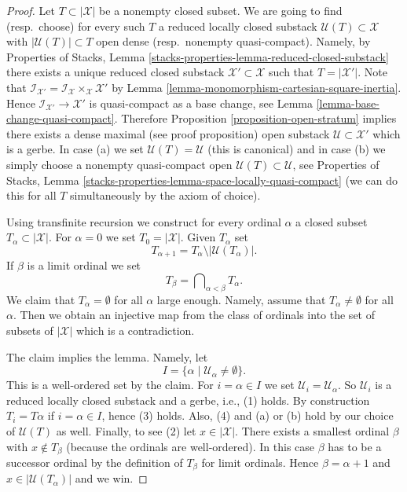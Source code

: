 \documentclass[10pt,a4paper]{amsart}
\theoremstyle{plain}
\theoremstyle{definition}
\theoremstyle{remark}
\numberwithin{equation}{subsection}
\begin{document}
\begin{proof}
Let $T \subset |\mathcal{X}|$ be a nonempty closed subset. We are going
to find (resp.\ choose) for every such $T$ a reduced locally closed substack
$\mathcal{U}(T) \subset \mathcal{X}$ with $|\mathcal{U}(T)| \subset T$
open dense (resp.\ nonempty quasi-compact). Namely, by
Properties of Stacks, Lemma
\ref{stacks-properties-lemma-reduced-closed-substack}
there exists a unique reduced closed substack
$\mathcal{X}' \subset \mathcal{X}$ such that $T = |\mathcal{X}'|$.
Note that $\mathcal{I}_{\mathcal{X}'} =
\mathcal{I}_\mathcal{X} \times_\mathcal{X} \mathcal{X}'$ by
Lemma \ref{lemma-monomorphism-cartesian-square-inertia}.
Hence $\mathcal{I}_{\mathcal{X}'} \to \mathcal{X}'$ is
quasi-compact as a base change, see
Lemma \ref{lemma-base-change-quasi-compact}.
Therefore
Proposition \ref{proposition-open-stratum}
implies there exists a dense maximal (see proof proposition)
open substack $\mathcal{U} \subset \mathcal{X}'$
which is a gerbe. In case (a) we set $\mathcal{U}(T) = \mathcal{U}$
(this is canonical) and in case (b) we simply choose a nonempty quasi-compact
open $\mathcal{U}(T) \subset \mathcal{U}$, see
Properties of Stacks, Lemma
\ref{stacks-properties-lemma-space-locally-quasi-compact}
(we can do this for all $T$
simultaneously by the axiom of choice).

\medskip\noindent
Using transfinite recursion we construct for every ordinal $\alpha$ a
closed subset $T_\alpha \subset |\mathcal{X}|$. For $\alpha = 0$
we set $T_0 = |\mathcal{X}|$. Given $T_\alpha$ set
$$
T_{\alpha + 1} = T_\alpha \setminus |\mathcal{U}(T_\alpha)|.
$$
If $\beta$ is a limit ordinal we set
$$
T_\beta = \bigcap\nolimits_{\alpha < \beta} T_\alpha.
$$
We claim that $T_\alpha = \emptyset$ for all $\alpha$
large enough. Namely, assume that $T_\alpha \not = \emptyset$
for all $\alpha$. Then we obtain an injective map from the class
of ordinals into the set of subsets of $|\mathcal{X}|$ which is a
contradiction.

\medskip\noindent
The claim implies the lemma. Namely, let
$$
I = \{\alpha \mid \mathcal{U}_\alpha \not = \emptyset \}.
$$
This is a well-ordered set by the claim. For $i = \alpha \in I$ we set
$\mathcal{U}_i = \mathcal{U}_\alpha$. So $\mathcal{U}_i$ is a reduced
locally closed substack and a gerbe, i.e., (1) holds. By construction
$T_i = T\alpha$ if $i = \alpha \in I$, hence (3) holds. Also, (4) and
(a) or (b) hold by our choice of $\mathcal{U}(T)$ as well. Finally, to see
(2) let $x \in |\mathcal{X}|$. There exists a smallest ordinal $\beta$
with $x \not \in T_\beta$ (because the ordinals are well-ordered).
In this case $\beta$ has to be a successor ordinal by the definition
of $T_\beta$ for limit ordinals. Hence $\beta = \alpha + 1$ and
$x \in |\mathcal{U}(T_\alpha)|$ and we win.
\end{proof}
\end{document}

